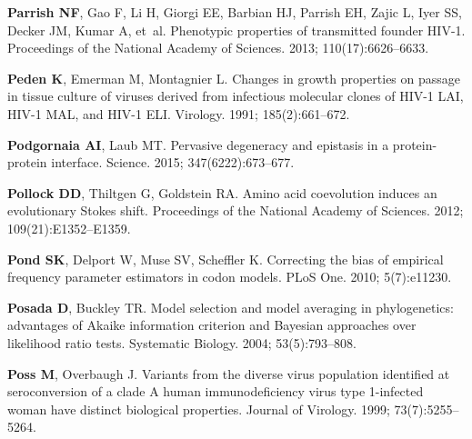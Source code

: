 \documentclass[9pt]{elife}
\begin{document}
\begin{thebibliography}{114}
\textbf{\color{eLifeMediumGrey} Parrish NF}, Gao F, Li H, Giorgi EE, Barbian
  HJ, Parrish EH, Zajic L, Iyer SS, Decker JM, Kumar A, et~al.
\newblock Phenotypic properties of transmitted founder {HIV-1}.
\newblock Proceedings of the National Academy of Sciences.  2013;
  110(17):6626--6633.

\textbf{\color{eLifeMediumGrey} Peden K}, Emerman M, Montagnier L.
\newblock Changes in growth properties on passage in tissue culture of viruses
  derived from infectious molecular clones of HIV-1 LAI, HIV-1 MAL, and HIV-1
  ELI.
\newblock Virology.  1991; 185(2):661--672.

\textbf{\color{eLifeMediumGrey} Podgornaia AI}, Laub MT.
\newblock Pervasive degeneracy and epistasis in a protein-protein interface.
\newblock Science.  2015; 347(6222):673--677.

\textbf{\color{eLifeMediumGrey} Pollock DD}, Thiltgen G, Goldstein RA.
\newblock Amino acid coevolution induces an evolutionary Stokes shift.
\newblock Proceedings of the National Academy of Sciences.  2012;
  109(21):E1352--E1359.

\textbf{\color{eLifeMediumGrey} Pond SK}, Delport W, Muse SV, Scheffler K.
\newblock Correcting the bias of empirical frequency parameter estimators in
  codon models.
\newblock PLoS One.  2010; 5(7):e11230.

\textbf{\color{eLifeMediumGrey} Posada D}, Buckley TR.
\newblock Model selection and model averaging in phylogenetics: advantages of
  Akaike information criterion and Bayesian approaches over likelihood ratio
  tests.
\newblock Systematic Biology.  2004; 53(5):793--808.

\textbf{\color{eLifeMediumGrey} Poss M}, Overbaugh J.
\newblock Variants from the diverse virus population identified at
  seroconversion of a clade A human immunodeficiency virus type 1-infected
  woman have distinct biological properties.
\newblock Journal of Virology.  1999; 73(7):5255--5264.


\end{thebibliography}
\end{document}

